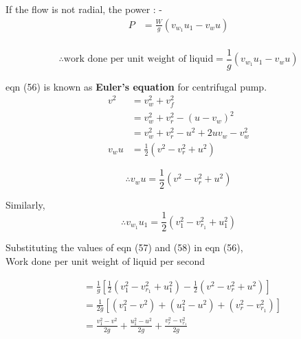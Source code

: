 \documentclass{article}
\begin{document}
\begin{multicols}{2}
    If the flow is not radial, the power : -
    \begin{align*}
      P &= \frac{W}{g}\left(v_{w_{1}} u_1 - v_w u\right) \\
    \end{align*}

    \begin{equation}
      \therefore \text{work done per unit weight of liquid} = \frac{1}{g} \left(v_{w_{1}} u_1 - v_w u\right) \label{eq:eq56}
    \end{equation}

    eqn (56) is known as \textbf{Euler's equation} for centrifugal pump. \\

    \begin{align*}
      v^2 &= v_w^2 + v_f^2 \\
      &= v_w^2 + v_r^2 - (u - v_w)^2 \\
      &= v_w^2 + v_r^2 - u^2 + 2uv_w - v_w^2 \\
      v_w u &= \frac{1}{2} \left(v^2 - v_r^2 + u^2 \right) 
    \end{align*}

    \begin{equation}
      \therefore v_w u = \frac{1}{2} \left(v^2 - v_r^2 + u^2 \right)  \label{eq:eq57}
    \end{equation}

    Similarly, 
    \begin{equation}
      \therefore v_{w_1} u_1 = \frac{1}{2} \left(v_1^2 - v_{r_1}^2 + u_1^2 \right)  \label{eq:eq58}
    \end{equation}

    Substituting the values of eqn (57) and (58) in eqn (56),\\
    Work done per unit weight of liquid per second

    \begin{align*}
      &= \frac{1}{g} \left[\frac{1}{2} \left(v_1^2 - v_{r_1}^2 + u_1^2\right) - \frac{1}{2} \left(v^2 - v_r^2 + u^2\right)\right] \\
      &= \frac{1}{2g} \left[\left(v_1^2 - v^2\right) + \left(u_1^2 - u^2\right) + \left(v_r^2 - v_{r_1}^2\right)\right] \\
      &= \frac{v_1^2 - v^2}{2g} + \frac{u_1^2 - u^2}{2g} + \frac{v_r^2 - v_{r_1}^2}{2g} \\
    \end{align*} 
    \end{multicols}
  
\end{document}
